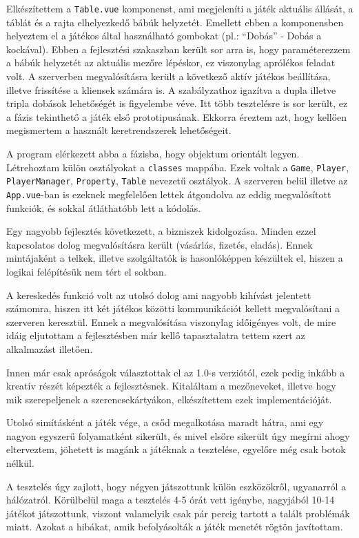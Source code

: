 Elkészítettem a \texttt{Table.vue} komponenst, ami megjeleníti a játék aktuális állását, a táblát és a rajta elhelyezkedő bábúk helyzetét. Emellett ebben a komponensben helyeztem el a játékos által használható gombokat (pl.: “Dobás” - Dobás a kockával). Ebben a fejlesztési szakaszban került sor arra is, hogy paraméterezzem a bábúk helyzetét az aktuális mezőre lépéskor, ez viszonylag aprólékos feladat volt. A szerverben megvalósításra került a következő aktív játékos beállítása, illetve frissítése a kliensek számára is. A szabályzathoz igazítva a dupla illetve tripla dobások lehetőségét is figyelembe véve. Itt több tesztelésre is sor került, ez a fázis tekinthető a játék első prototipusának. Ekkorra éreztem azt, hogy kellően megismertem a használt keretrendszerek lehetőségeit.

A program elérkezett abba a fázisba, hogy objektum orientált legyen. Létrehoztam külön osztályokat a \texttt{classes} mappába. Ezek voltak a \texttt{Game}, \texttt{Player}, \texttt{PlayerManager}, \texttt{Property}, \texttt{Table} nevezetű osztályok. A szerveren belül illetve az \texttt{App.vue}-ban is ezeknek megfelelően lettek átgondolva az eddig megvalósított funkciók, és sokkal átláthatóbb lett a kódolás.

Egy nagyobb fejlesztés következett, a bizniszek kidolgozása. Minden ezzel kapcsolatos dolog megvalósításra került (vásárlás, fizetés, eladás). Ennek mintájaként a telkek, illetve szolgáltatók is hasonlóképpen készültek el, hiszen a logikai felépítésük nem tért el sokban.

A kereskedés funkció volt az utolsó dolog ami nagyobb kihívást jelentett számomra, hiszen itt két játékos közötti kommunikációt kellett megvalósítani a szerveren keresztül. Ennek a megvalósítása viszonylag időigényes volt, de mire idáig eljutottam a fejlesztésben már kellő tapasztalatra tettem szert az alkalmazást illetően.

Innen már csak apróságok választottak el az 1.0-s verziótól, ezek pedig inkább a kreatív részét képezték a fejlesztésnek. Kitaláltam a mezőneveket, illetve hogy mik szerepeljenek a szerencsekártyákon, elkészítettem ezek implementációját.

Utolsó simításként a játék vége, a csőd megalkotása maradt hátra, ami egy nagyon egyszerű folyamatként sikerült, és mivel elsőre sikerült úgy megírni ahogy elterveztem, jöhetett is magánk a játéknak a tesztelése, egyelőre még csak botok nélkül.

A tesztelés úgy zajlott, hogy négyen játszottunk külön eszközökről, ugyanarról a hálózatról. Körülbelül maga a tesztelés 4-5 órát vett igénybe, nagyjából 10-14 játékot játszottunk, viszont valamelyik csak pár percig tartott a talált problémák miatt. Azokat a hibákat, amik befolyásolták a játék menetét rögtön javítottam.

